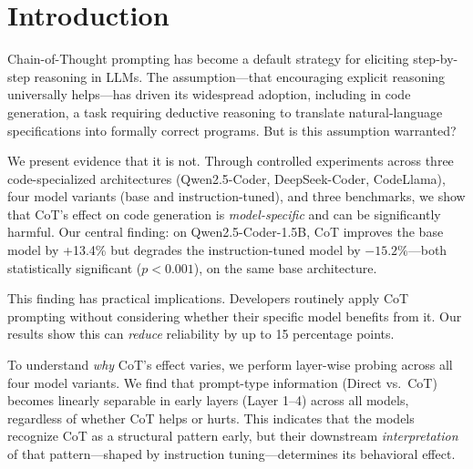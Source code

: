 \documentclass[11pt]{article}
\begin{document}
\section{Introduction}

Chain-of-Thought prompting \citep{wei2022chain} has become a default strategy for eliciting step-by-step reasoning in LLMs. The assumption---that encouraging explicit reasoning universally helps---has driven its widespread adoption, including in code generation, a task requiring deductive reasoning to translate natural-language specifications into formally correct programs. But is this assumption warranted?

We present evidence that it is not. Through controlled experiments across three code-specialized architectures (Qwen2.5-Coder, DeepSeek-Coder, CodeLlama), four model variants (base and instruction-tuned), and three benchmarks, we show that CoT's effect on code generation is \emph{model-specific} and can be significantly harmful. Our central finding: on Qwen2.5-Coder-1.5B, CoT improves the base model by +13.4\% but degrades the instruction-tuned model by $-15.2\%$---both statistically significant ($p{<}0.001$), on the same base architecture.

This finding has practical implications. Developers routinely apply CoT prompting without considering whether their specific model benefits from it. Our results show this can \emph{reduce} reliability by up to 15 percentage points.

To understand \emph{why} CoT's effect varies, we perform layer-wise probing across all four model variants. We find that prompt-type information (Direct vs.\ CoT) becomes linearly separable in early layers (Layer 1--4) across all models, regardless of whether CoT helps or hurts. This indicates that the models recognize CoT as a structural pattern early, but their downstream \emph{interpretation} of that pattern---shaped by instruction tuning---determines its behavioral effect.
\end{document}
